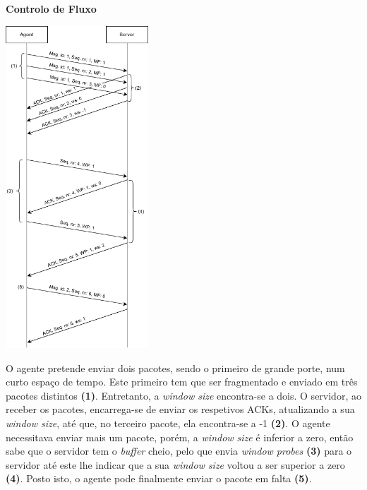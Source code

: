 \documentclass[a4paper,12pt]{scrreprt}
\begin{document}
\textbf{Controlo de Fluxo}

\begin{minipage}{\textwidth}
    \centering
    \includegraphics[width=0.4\textwidth]{img/sequence_diagrams/flux_control.png}
    \label{fig:nt_flux_control}
\end{minipage}

O agente pretende enviar dois pacotes, sendo o primeiro de grande porte, num curto espaço de tempo. Este primeiro tem que ser
fragmentado e enviado em três pacotes distintos \textbf{(1)}. Entretanto, a \textit{window size} encontra-se a dois.
O servidor, ao receber os pacotes, encarrega-se de enviar os respetivos ACKs, atualizando a sua \textit{window size}, até que, no terceiro
pacote, ela encontra-se a -1 \textbf{(2)}. O agente necessitava enviar mais um pacote, porém, a \textit{window size} é inferior a zero,
então sabe que o servidor tem o \textit{buffer} cheio, pelo que envia \textit{window probes} \textbf{(3)} para o servidor
até este lhe indicar que a sua \textit{window size} voltou a ser superior a zero \textbf{(4)}. Posto isto, o agente pode finalmente enviar
o pacote em falta \textbf{(5)}.


\end{document}

